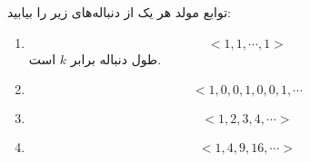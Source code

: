 \EXERCISE
توابع مولد هر یک از دنباله‌های زیر را بیابید:
\begin{enumerate}
\item
$$<1, 1, \cdots, 1>$$
طول دنباله برابر
$k$
است.
\item
$$<1, 0, 0, 1, 0, 0, 1, \cdots$$
\item
$$<1, 2, 3, 4, \cdots>$$
\item
$$<1, 4, 9, 16, \cdots>$$
\end{enumerate}
